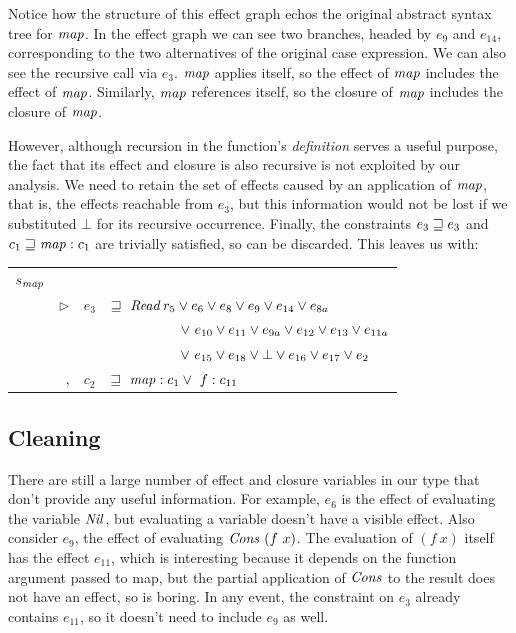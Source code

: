 Notice how the structure of this effect graph echos the original abstract syntax tree for $\operatorname{\mathit{map}}$. In the effect graph we can see two branches, headed by $e_9$ and $e_{14}$, corresponding to the two alternatives of the original case expression. We can also see the recursive call via $e_3$. $\operatorname{\mathit{map}}$ applies itself, so the effect of $\operatorname{\mathit{map}}$ includes the effect of $\operatorname{\mathit{map}}$. Similarly, $\operatorname{\mathit{map}}$ references itself, so the closure of $\operatorname{\mathit{map}}$ includes the closure of $\operatorname{\mathit{map}}$.

However, although recursion in the function's \emph{definition} serves a useful purpose, the fact that its effect and closure is also recursive is not exploited by our analysis. We need to retain the set of effects caused by an application of $\operatorname{\mathit{map}}$, that is, the effects reachable from $e_3$, but this information would not be lost if we substituted $\bot$ for its recursive occurrence. Finally, the constraints $e_3 \sqsupseteq e_3$ and $c_1 \sqsupseteq \operatorname{\mathit{map}} : c_1$ are trivially satisfied, so can be discarded. This leaves us with:

\bigskip
\qq
\begin{tabular}{llll}
	$s_{\operatorname{\mathit{map}}}$	
		& \mc{3}{$= (s_x \lfuna{e_{11a} \ c_{11}} s_{11}) 
				\lfuna{e_2 \ c_1} \iList \ r_5 \ s_x 
				\lfuna{e_3 \ c_2} \ \iList \ r_6 \ s_{11}$} 
		\\[1ex]
		& $\rhd$ & $e_3$ 	& $\sqsupseteq \ \operatorname{\mathit{Read}} r_5 \lor e_6 \lor e_8 \lor e_9 \lor e_{14} \lor e_{8a}$ \\
		&	 &		& $ \qq \qq \ \ \ \lor \ e_{10} \lor e_{11} \lor e_{9a} \lor e_{12} \lor e_{13} \lor e_{11a}$ \\
		&	 &		& $ \qq \qq \ \ \ \lor \ e_{15} \lor e_{18} \lor \bot \lor e_{16} \lor e_{17} \lor e_{2}$ \\
		& \ , 	 & $c_{2}$	& $\sqsupseteq \  \operatorname{\mathit{map}} : c_1 \lor \ f : c_{11}$
\end{tabular}


\subsection{Cleaning}
There are still a large number of effect and closure variables in our type that don't provide any useful information. For example, $e_6$ is the effect of evaluating the variable $\operatorname{\mathit{Nil}}$, but evaluating a variable doesn't have a visible effect. Also consider $e_9$, the effect of evaluating $\iCons \ (f \ x)$. The evaluation of $(f \ x)$ itself has the effect $e_{11}$, which is interesting because it depends on the function argument passed to map, but the partial application of $\operatorname{\mathit{Cons}}$ to the result does not have an effect, so is boring. In any event, the constraint on $e_3$ already contains $e_{11}$, so it doesn't need to include $e_9$ as well.

